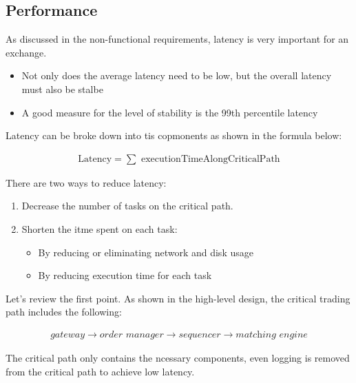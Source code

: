 \documentclass{report}
\theoremstyle{definition}
\let\oldsubsection\subsection
\renewcommand{\subsection}{\oldsubsection*}
\begin{document}
\subsection{Performance}

As discussed in the non-functional requirements, latency is very important for an exchange.

\begin{itemize}
\item
Not only does the average latency need to be low, but the overall latency must also be stalbe
\item
A good measure for the level of stability is the 99th percentile latency
\end{itemize}

Latency can be broke down into tis copmonents as shown in the formula below:

\begin{align*}
\text{Latency} = \sum \text{ executionTimeAlongCriticalPath}
\end{align*}

There are two ways to reduce latency:

\begin{enumerate}
\item
Decrease the number of tasks on the critical path.
\item
Shorten the itme spent on each task:

\begin{itemize}
\item
By reducing or eliminating network and disk usage
\item
By reducing execution time for each task
\end{itemize}
\end{enumerate}

Let's review the first point. As shown in the high-level design, the critical trading path includes the following:

\begin{align*}
\textit{gateway} \rightarrow \textit{order manager} \rightarrow \textit{sequencer} \rightarrow \textit{matching engine}
\end{align*}

The critical path only contains the ncessary components, even logging is removed from the critical path to achieve low latency.
\end{document}
